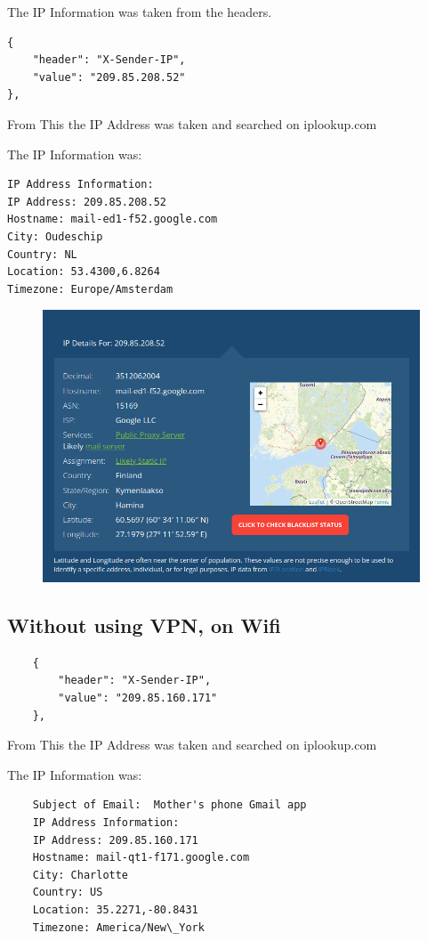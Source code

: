 \documentclass[11pt]{article}
\begin{document}
The IP Information was taken from the headers. 

\begin{verbatim}
{
    "header": "X-Sender-IP",
    "value": "209.85.208.52"
},
\end{verbatim}

From This the IP Address was taken and searched on iplookup.com

The IP Information was: 
\begin{verbatim}
IP Address Information:
IP Address: 209.85.208.52
Hostname: mail-ed1-f52.google.com
City: Oudeschip
Country: NL
Location: 53.4300,6.8264
Timezone: Europe/Amsterdam
\end{verbatim}

\begin{figure}[H]
    \centering
    \includegraphics[width=.85\textwidth]{52.png}
    \caption{}
\end{figure}

\subsection{Without using VPN, on Wifi}

\begin{verbatim}
    {
        "header": "X-Sender-IP",
        "value": "209.85.160.171"
    },
    \end{verbatim}
    
    From This the IP Address was taken and searched on iplookup.com
    
    The IP Information was: 
    \begin{verbatim}
    Subject of Email:  Mother's phone Gmail app
    IP Address Information:
    IP Address: 209.85.160.171
    Hostname: mail-qt1-f171.google.com
    City: Charlotte
    Country: US
    Location: 35.2271,-80.8431
    Timezone: America/New\_York
    \end{verbatim}
    
\end{document}
